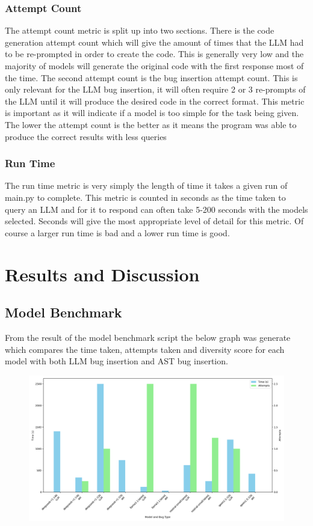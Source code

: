 \documentclass[12pt]{extarticle}
\begin{document}
\subsubsection{Attempt Count}

The attempt count metric is split up into two sections. There is the code generation attempt count which will give the amount of times that the LLM had to be re-prompted in order to create the code. This is generally very low and the majority of models will generate the original code with the first response most of the time. The second attempt count is the bug insertion attempt count. This is only relevant for the LLM bug insertion, it will often require 2 or 3 re-prompts of the LLM until it will produce the desired code in the correct format. This metric is important as it will indicate if a model is too simple for the task being given. The lower the attempt count is the better as it means the program was able to produce the correct results with less queries

\subsubsection{Run Time}

The run time metric is very simply the length of time it takes a given run of main.py to complete. This metric is counted in seconds as the time taken to query an LLM and for it to respond can often take 5-200 seconds with the models selected. Seconds will give the most appropriate level of detail for this metric. Of course a larger run time is bad and a lower run time is good.
\newpage
\section{Results and Discussion}

\subsection{Model Benchmark}

From the result of the model benchmark script the below graph was generate which compares the time taken, attempts taken and diversity score for each model with both LLM bug insertion and AST bug insertion.
\begin{figure}[h!]
\centering
\includegraphics[width=\linewidth]{Images/Model_Comparison_Fibbonaci.png}
\label{fig:Model_Benchmark}
\end{figure}
\end{document}
